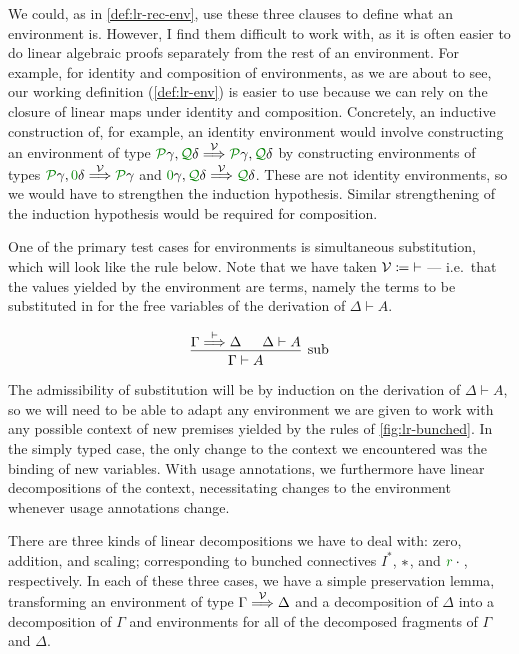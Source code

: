 We could, as in \cref{def:lr-rec-env}, use these three clauses to define what an
environment is.
However, I find them difficult to work with, as it is often easier to do
linear algebraic proofs separately from the rest of an environment.
For example, for identity and composition of environments, as we are about to
see, our working definition (\cref{def:lr-env})
is easier to use because we can rely on the closure of linear maps under
identity and composition.
Concretely, an inductive construction of, for example, an identity environment
would involve constructing an environment of type
$\grP\gamma, \grQ\delta \env\V \grP\gamma, \grQ\delta$ by constructing
environments of types $\grP\gamma, \gr0\delta \env\V \grP\gamma$ and
$\gr0\gamma, \grQ\delta \env\V \grQ\delta$.
These are not identity environments, so we would have to strengthen the
induction hypothesis.
Similar strengthening of the induction hypothesis would be required for
composition.

One of the primary test cases for environments is simultaneous substitution,
which will look like the  rule below.
Note that we have taken $\mathcal V \coloneqq {\vdash}$ --- i.e.\ that the values
yielded by the environment are terms, namely the terms to be substituted in for
the free variables of the derivation of $\Delta \vdash A$.

\begin{displaymath}
  \begin{prooftree}
    \hypo{\Gamma \env{\vdash} \Delta}
    \hypo{\Delta \vdash A}
    \infer2[sub]{\Gamma \vdash A}
  \end{prooftree}
\end{displaymath}

The admissibility of substitution will be by induction on the derivation of
$\Delta \vdash A$, so we will need to be able to adapt any environment we are
given to work with any possible context of new premises yielded by the rules of
\cref{fig:lr-bunched}.
In the simply typed case, the only change to the context we encountered was the
binding of new variables.
With usage annotations, we furthermore have linear decompositions of the
context, necessitating changes to the environment whenever usage annotations
change.

There are three kinds of linear decompositions we have to deal with: zero,
addition, and scaling; corresponding to bunched connectives $I^*$, $\mathbin{*}$, and
$\gr r \cdot {}$, respectively.
In each of these three cases, we have a simple preservation lemma, transforming
an environment
of type $\Gamma \stackrel{\mathcal V}\Longrightarrow \Delta$ and a decomposition of $\Delta$ into a
decomposition of $\Gamma$ and environments for all of the decomposed fragments
of $\Gamma$ and $\Delta$.

